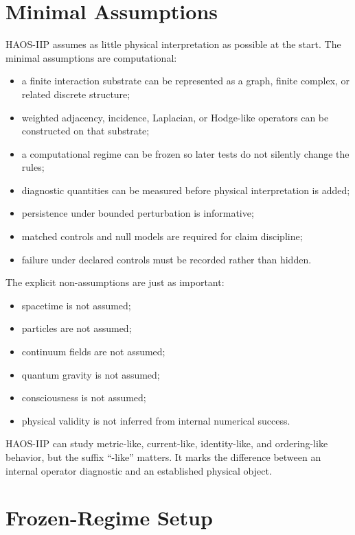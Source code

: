 \documentclass[11pt]{article}
\begin{document}
\section{Minimal Assumptions}

HAOS-IIP assumes as little physical interpretation as possible at the start. The minimal assumptions are computational:

\begin{itemize}
\item a finite interaction substrate can be represented as a graph, finite complex, or related discrete structure;
\item weighted adjacency, incidence, Laplacian, or Hodge-like operators can be constructed on that substrate;
\item a computational regime can be frozen so later tests do not silently change the rules;
\item diagnostic quantities can be measured before physical interpretation is added;
\item persistence under bounded perturbation is informative;
\item matched controls and null models are required for claim discipline;
\item failure under declared controls must be recorded rather than hidden.
\end{itemize}

The explicit non-assumptions are just as important:

\begin{itemize}
\item spacetime is not assumed;
\item particles are not assumed;
\item continuum fields are not assumed;
\item quantum gravity is not assumed;
\item consciousness is not assumed;
\item physical validity is not inferred from internal numerical success.
\end{itemize}

HAOS-IIP can study metric-like, current-like, identity-like, and ordering-like behavior, but the suffix ``-like'' matters. It marks the difference between an internal operator diagnostic and an established physical object.

\section{Frozen-Regime Setup}
\end{document}
